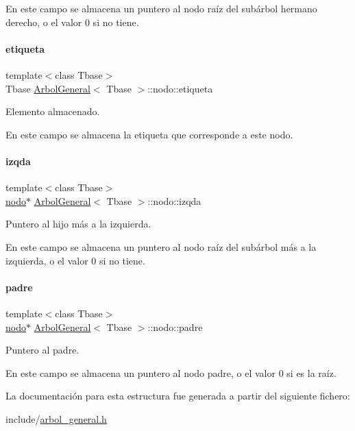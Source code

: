En este campo se almacena un puntero al nodo raíz del subárbol hermano derecho, o el valor 0 si no tiene. \hypertarget{structArbolGeneral_1_1nodo_ab7223965c5a62aa93895f3decd7a109a}{}\label{structArbolGeneral_1_1nodo_ab7223965c5a62aa93895f3decd7a109a} 
\paragraph{\texorpdfstring{etiqueta}{etiqueta}}
{\footnotesize\ttfamily template$<$class Tbase$>$ \\
Tbase \hyperlink{classArbolGeneral}{Arbol\+General}$<$ Tbase $>$\+::nodo\+::etiqueta}



Elemento almacenado. 

En este campo se almacena la etiqueta que corresponde a este nodo. \hypertarget{structArbolGeneral_1_1nodo_a3b8075b9fd0dc27c2272ba48bd9a9221}{}\label{structArbolGeneral_1_1nodo_a3b8075b9fd0dc27c2272ba48bd9a9221} 
\paragraph{\texorpdfstring{izqda}{izqda}}
{\footnotesize\ttfamily template$<$class Tbase$>$ \\
\hyperlink{structArbolGeneral_1_1nodo}{nodo}$\ast$ \hyperlink{classArbolGeneral}{Arbol\+General}$<$ Tbase $>$\+::nodo\+::izqda}



Puntero al hijo más a la izquierda. 

En este campo se almacena un puntero al nodo raíz del subárbol más a la izquierda, o el valor 0 si no tiene. \hypertarget{structArbolGeneral_1_1nodo_ab4d70a0179e8450b2842bbf1a6481402}{}\label{structArbolGeneral_1_1nodo_ab4d70a0179e8450b2842bbf1a6481402} 
\paragraph{\texorpdfstring{padre}{padre}}
{\footnotesize\ttfamily template$<$class Tbase$>$ \\
\hyperlink{structArbolGeneral_1_1nodo}{nodo}$\ast$ \hyperlink{classArbolGeneral}{Arbol\+General}$<$ Tbase $>$\+::nodo\+::padre}



Puntero al padre. 

En este campo se almacena un puntero al nodo padre, o el valor 0 si es la raíz. 

La documentación para esta estructura fue generada a partir del siguiente fichero\+:\begin{DoxyCompactItemize}
\item 
include/\hyperlink{arbol__general_8h}{arbol\+\_\+general.\+h}\end{DoxyCompactItemize}
